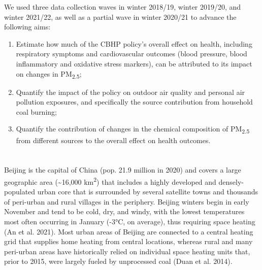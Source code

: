 \documentclass[
  letterpaper,
  DIV=11,
  numbers=noendperiod]{scrartcl}
\providecommand{\DIFadd}[1]{{\protect\color{blue}\uwave{#1}}} %
\providecommand{\DIFaddbegin}{} %
\providecommand{\DIFaddend}{} %
\providecommand{\DIFdelbegin}{} %
\providecommand{\DIFdelend}{} %
\newcommand{\DIFscaledelfig}{0.5}
\newlength{\DIFdelgraphicswidth} %
\newlength{\DIFdelgraphicsheight} %
\newcommand{\DIFaddincludegraphics}[2][]{{\color{blue}\fbox{\DIFOincludegraphics[#1]{#2}}}} %
\newcommand{\DIFdelincludegraphics}[2][]{%
\sbox{\DIFdelgraphicsbox}{\DIFOincludegraphics[#1]{#2}}%
\settoboxwidth{\DIFdelgraphicswidth}{\DIFdelgraphicsbox} %
\settoboxtotalheight{\DIFdelgraphicsheight}{\DIFdelgraphicsbox} %
\scalebox{\DIFscaledelfig}{%
\parbox[b]{\DIFdelgraphicswidth}{\usebox{\DIFdelgraphicsbox}\\[-\baselineskip] \rule{\DIFdelgraphicswidth}{0em}}\llap{\resizebox{\DIFdelgraphicswidth}{\DIFdelgraphicsheight}{%
\setlength{\unitlength}{\DIFdelgraphicswidth}%
\begin{picture}(1,1)%
\thicklines\linethickness{2pt} %
{\color[rgb]{1,0,0}\put(0,0){\framebox(1,1){}}}%
{\color[rgb]{1,0,0}\put(0,0){\line( 1,1){1}}}%
{\color[rgb]{1,0,0}\put(0,1){\line(1,-1){1}}}%
\end{picture}%
}\hspace*{3pt}}} %
} %
\DeclareRobustCommand{\DIFaddbegin}{\DIFOaddbegin \let\includegraphics\DIFaddincludegraphics} %
\DeclareRobustCommand{\DIFaddend}{\DIFOaddend \let\includegraphics\DIFOincludegraphics} %
\DeclareRobustCommand{\DIFdelbegin}{\DIFOdelbegin \let\includegraphics\DIFdelincludegraphics} %
\DeclareRobustCommand{\DIFdelend}{\DIFOaddend \let\includegraphics\DIFOincludegraphics} %
\begin{document}
We used three data collection waves in winter 2018/19, winter 2019/20,
and winter 2021/22, as well as a partial wave in winter 2020/21 to
advance the following aims:

\begin{enumerate}
\def\labelenumi{\arabic{enumi}.}
\item
  Estimate how much of the CBHP policy's overall effect on health,
  including respiratory symptoms and cardiovascular outcomes (blood
  pressure, blood inflammatory and oxidative stress markers), can be
  attributed to its impact on changes in PM\textsubscript{2.5};
\item
  Quantify the impact of the policy on outdoor air quality and personal
  air pollution exposures, and specifically the source contribution from
  household coal burning;
\item
  Quantify the contribution of changes in the chemical composition of
  PM\textsubscript{2.5} from different sources to the overall effect on
  health outcomes.
\end{enumerate}

\DIFdelbegin %
\DIFdelend \DIFaddbegin \section{\DIFadd{Study Design and Methods}}\label{study-design-and-methods}
\DIFaddend 

\DIFdelbegin %
\DIFdelend \DIFaddbegin \subsection{\DIFadd{Study area}}\label{study-area}
\DIFaddend 

Beijing is the capital of China (pop. 21.9 million in 2020) and covers a
large geographic area (\textasciitilde16,000 km\textsuperscript{2}) that
includes a highly developed and densely-populated urban core that is
surrounded by several satellite towns and thousands of peri-urban and
rural villages in the periphery. Beijing winters begin in early November
and tend to be cold, dry, and windy, with the lowest temperatures most
often occurring in January (-3°C, on average), thus requiring space
heating (An et al. 2021). Most urban areas of Beijing are connected to a
central heating grid that supplies home heating from central locations,
whereas rural and many peri-urban areas have historically relied on
individual space heating units that, prior to 2015, were largely fueled
by unprocessed coal (Duan et al. 2014).
\end{document}
